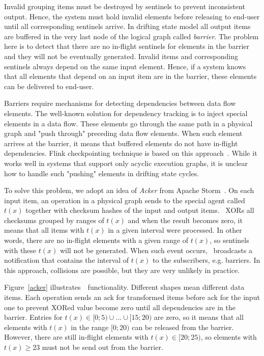 Invalid grouping items must be destroyed by sentinels to prevent inconsistent output. Hence, the system must hold invalid elements before releasing to end-user until all corresponding sentinels arrive. In drifting state model all output items are buffered in the very last node of the logical graph called {\em barrier}. The problem here is to detect that there are no in-flight sentinels for elements in the barrier and they will not be eventually generated. Invalid items and corresponding sentinels always depend on the same input element. Hence, if a system knows that all elements that depend on an input item are in the barrier, these elements can be delivered to end-user. 

Barriers require mechanisms for detecting dependencies between data flow elements. The well-known solution for dependency tracking is to inject special elements in a data flow. These elements go through the same path in a physical graph and "push through" preceding data flow elements. When such element arrives at the barrier, it means that buffered elements do not have in-flight dependencies. Flink checkpointing technique is based on this approach~\cite{Carbone:2017:SMA:3137765.3137777}. While it works well in systems that support only acyclic execution graphs, it is unclear how to handle such "pushing" elements in drifting state cycles. 

To solve this problem, we adopt an idea of {\em Acker} from Apache Storm~\cite{apache:storm}. On each input item, an operation in a physical graph sends to the special agent called~{\em \Acker\ } $t(x)$ together with checksum hashes of the input and output items. \Acker\ XORs all checksums grouped by ranges of $t(x)$ and when the result becomes zero, it means that all items with $t(x)$ in a given interval were processed. In other words, there are no in-flight elements with a given range of $t(x)$, so sentinels with these $t(x)$ will not be generated. When such event occurs, \Acker\ broadcasts a notification that contains the interval of $t(x)$ to the subscribers, e.g. barriers. In this approach, collisions are possible, but they are very unlikely in practice.

Figure~\ref{acker} illustrates~\Acker\ functionality. Different shapes mean different data items. Each operation sends an ack for transformed items before ack for the input one to prevent XORed value become zero until all dependencies are in the barrier. Entries for $t(x) \in [0;5) \cup ... \cup [15;20)$ are zero, so it means that all elements with $t(x)$ in the range $[0;20)$ can be released from the barrier. However, there are still in-flight elements with $t(x) \in [20;25)$, so elements with $t(x) \geq 23$ must not be send out from the barrier.

